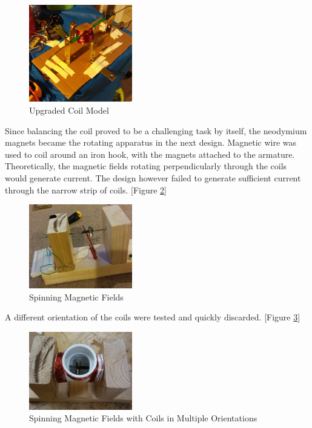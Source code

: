    \begin{figure}[!ht]
        \begin{center}
            \includegraphics[width=0.4\textwidth]{figures/models/2.jpg}
        \end{center} \caption{Upgraded Coil Model} \label{fig:model2}
    \end{figure}

    \noindent
    Since balancing the coil proved to be a challenging task by itself, the neodymium magnets became the rotating apparatus in the next design. Magnetic wire was used to coil around an iron hook, with the magnets attached to the armature. Theoretically, the magnetic fields rotating perpendicularly through the coils would generate current. The design however failed to generate sufficient current through the narrow strip of coils. [Figure \ref{fig:model3}]\\

    \begin{figure}[!ht]
        \begin{center}
            \includegraphics[width=0.4\textwidth]{figures/models/3.jpg}
        \end{center} \caption{Spinning Magnetic Fields} \label{fig:model3}
    \end{figure}

    \noindent
    A different orientation of the coils were tested and quickly discarded. [Figure \ref{fig:model4}]

    \begin{figure}[!ht]
        \begin{center}
            \includegraphics[width=0.4\textwidth]{figures/models/4.jpg}
        \end{center} \caption{Spinning Magnetic Fields with Coils in Multiple Orientations} \label{fig:model4}
    \end{figure}


